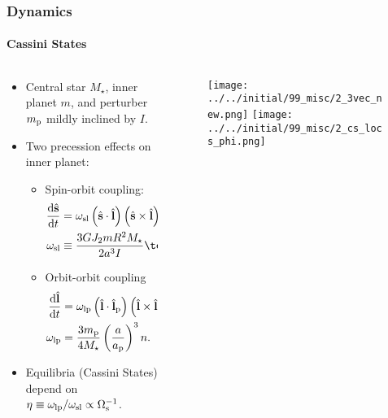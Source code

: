 \documentclass[dvipsnames, 9pt]{beamer}
\newcommand*{\rd}[2]{\frac{\mathrm{d}#1}{\mathrm{d}#2}}
\newcommand*{\bm}[1]{\boldsymbol{\mathbf{#1}}}
\newcommand*{\uv}[1]{\hat{\bm{#1}}}
\newcommand*{\p}[1]{\left(#1\right)}
\begin{document}
\begin{frame}
    \frametitle{Dynamics}
    \framesubtitle{Cassini States}

    \begin{columns}
        \begin{column}{0.5\columnwidth}
            \begin{itemize}
                \item Central star $M_\star$, inner planet $m$, and perturber
                    $m_{\rm p}$ mildly inclined by $I$.

                \item Two precession effects on inner planet:
                \begin{itemize}
                    \item Spin-orbit coupling:
                        \begin{align*}
                            \rd{\uv{s}}{t}
                                &= \omega_{\rm sl}
                                    \p{\uv{s} \cdot \uv{l}}
                                    \p{\uv{s} \times \uv{l}},\\
                            \omega_{\rm sl}
                                &\equiv
                                    \frac{3GJ_2 mR^2 M_\star}
                                    {2a^3 I}\textcolor{red}{\Omega_{\rm s}}.
                        \end{align*}

                    \item Orbit-orbit coupling
                        \begin{align*}
                            \rd{\uv{l}}{t}
                                &= \omega_{\rm lp}
                                    \p{\uv{l} \cdot \uv{l}_{\rm p}}
                                    \p{\uv{l} \times \uv{l}_{\rm p}},\\
                            \omega_{\rm lp}
                                &= \frac{3m_{\rm p}}{4M_\star}
                                \p{\frac{a}{a_{\rm p}}}^3 n.
                        \end{align*}
                \end{itemize}

                \item Equilibria (Cassini States) depend on $\eta \equiv
                    \omega_{\rm lp} / \omega_{\rm sl} \propto \Omega_{\rm
                    s}^{-1}$. \end{itemize}
        \end{column}
        \begin{column}{0.5\columnwidth}
            \begin{figure}
                \centering
                \texttt{[image: ../../initial/99\_misc/2\_3vec\_new.png]}
                \texttt{[image: ../../initial/99\_misc/2\_cs\_locs\_phi.png]}
            \end{figure}
        \end{column}
    \end{columns}
\end{frame}
\end{document}
